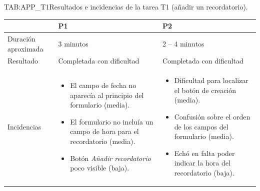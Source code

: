 \begin{table}[Incidencias T1]{TAB:APP_T1}{Resultados e
incidencias de la tarea T1 (añadir un recordatorio).}
\begin{center}
\begin{tabular}{p{3.5cm}p{4.5cm}p{4.5cm}}
\toprule
& \textbf{P1} & \textbf{P2} \\
\midrule
Duración aproximada    & 3 minutos      & 2 -- 4 minutos \\
Resultado              & Completada con dificultad & Completada con dificultad \\
\midrule
Incidencias  &
\begin{itemize}\setlength\itemsep{0pt}\setlength\parsep{0pt}
\item El campo de fecha no aparecía al principio del formulario (media).
\item El formulario no incluía un campo de hora para el recordatorio (media).
\item Botón \emph{Añadir recordatorio} poco visible (baja).
\end{itemize}
&
\begin{itemize}\setlength\itemsep{0pt}\setlength\parsep{0pt}
\item Dificultad para localizar el botón de creación (media).
\item Confusión sobre el orden de los campos del formulario (media).
\item Echó en falta poder indicar la hora del recordatorio (baja).
\end{itemize}\\
\bottomrule
\end{tabular}
\end{center}
\end{table}
\FloatBarrier

